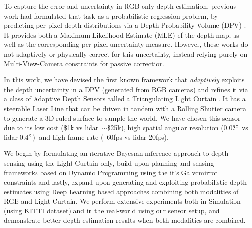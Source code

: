 \documentclass[review]{cvpr}
\begin{document}
To capture the error and uncertainty in RGB-only depth estimation, previous work had formulated that task as a probabilistic regression problem, by predicting per-pixel depth distributions via a Depth Probability Volume (DPV) \cite{liu2019neural} \cite{chang2018pyramid} \cite{yang2019inferring}. It provides both a Maximum Likelihood-Estimate (MLE) of the depth map, as well as the corresponding per-pixel uncertainty measure. However, these works do not adaptively or physically correct for this uncertainty, instead relying purely on Multi-View-Camera constraints for passive correction.

In this work, we have devised the first known framework that \textit{adaptively} exploits the depth uncertainty in a DPV (generated from RGB cameras) and refines it via a class of Adaptive Depth Sensors called a Triangulating Light Curtain \cite{bartels2019Agile}. It has a steerable Laser Line that can be driven in tandem with a Rolling Shutter camera to generate a 3D ruled surface to sample the world. We have chosen this sensor due to its low cost (\$1k vs lidar~$\sim$\$25k), high spatial angular resolution (0.02$\degree$ vs lidar 0.4$\degree$), and high frame-rate (~60fps vs lidar 20fps).

We begin by formulating an iterative Bayesian inference approach to depth sensing using the Light Curtain only, build upon planning and sensing frameworks based on Dynamic Programming using the it's Galvomirror constraints and lastly, expand upon generating and exploiting probabilistic depth estimates using Deep Learning based approaches combining both modalities of RGB and Light Curtain. We perform extensive experiments both in Simulation (using KITTI \cite{Geiger2013IJRR} dataset) and in the real-world using our sensor setup, and demonstrate better depth estimation results when both modalities are combined.





  

{\small


}
\end{document}
